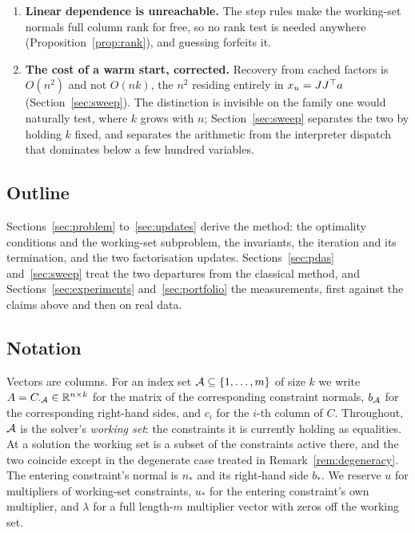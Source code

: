 \begin{enumerate}
\item \textbf{Linear dependence is unreachable.} The step rules make the
working-set normals full column rank for free, so no rank test is needed anywhere
(Proposition~\ref{prop:rank}), and guessing forfeits it.

\item \textbf{The cost of a warm start, corrected.} Recovery from cached factors
is $O(n^2)$ and not $O(nk)$, the $n^2$ residing entirely in $x_u = JJ^{\top} a$
(Section~\ref{sec:sweep}). The distinction is invisible on the family one would
naturally test, where $k$ grows with $n$; Section~\ref{sec:sweep} separates
the two by holding $k$ fixed, and separates the arithmetic from the interpreter
dispatch that dominates below a few hundred variables.

\end{enumerate}

\subsection{Outline}

Sections~\ref{sec:problem} to~\ref{sec:updates} derive the method: the optimality
conditions and the working-set subproblem, the invariants, the iteration and its
termination, and the two factorisation updates.
Sections~\ref{sec:pdas} and~\ref{sec:sweep} treat the
two departures from the classical method, and Sections~\ref{sec:experiments}
and~\ref{sec:portfolio} the measurements, first against the claims above and then
on real data.

\subsection{Notation}

Vectors are columns. For an index set $\mathcal{A} \subseteq \{1,\dots,m\}$ of size
$k$ we write $A = C_{\cdot\mathcal{A}} \in \mathbb{R}^{n \times k}$ for the matrix of the
corresponding constraint normals, $b_{\mathcal{A}}$ for the corresponding right-hand
sides, and $c_i$ for the $i$-th column of $C$. Throughout, $\mathcal{A}$ is the
solver's \emph{working set}: the constraints it is currently holding as
equalities. At a solution the working set is a subset of the constraints active
there, and the two coincide except in the degenerate case treated in
Remark~\ref{rem:degeneracy}. The entering constraint's normal is $n_*$ and its
right-hand side $b_*$. We reserve $u$ for multipliers of working-set constraints,
$u_*$ for the entering constraint's own multiplier, and $\lambda$ for a full
length-$m$ multiplier vector with zeros off the working set.
